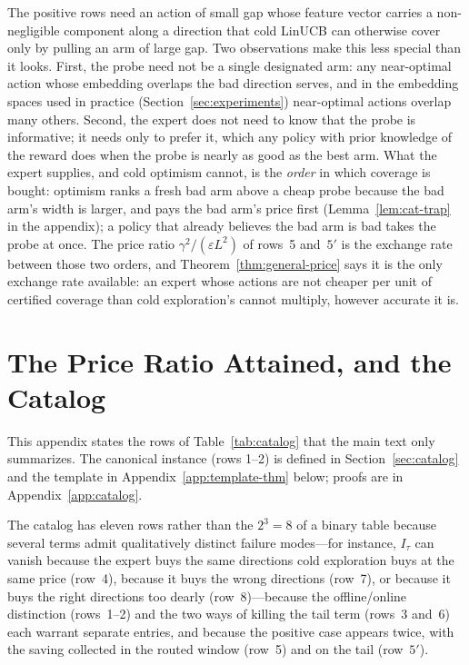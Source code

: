 \documentclass[anon]{alt2027} %
\newcommand{\eps}{\varepsilon}
\begin{document}
The positive rows need an action of small gap whose feature vector carries a
non-negligible component along a direction that cold LinUCB can otherwise
cover only by pulling an arm of large gap. Two observations make this less
special than it looks. First, the probe need not be a single designated arm:
any near-optimal action whose embedding overlaps the bad direction serves,
and in the embedding spaces used in practice (Section~\ref{sec:experiments})
near-optimal actions overlap many others. Second, the expert does not need to
know that the probe is informative; it needs only to prefer it, which any
policy with prior knowledge of the reward does when the probe is nearly as
good as the best arm. What the expert supplies, and cold optimism cannot, is
the \emph{order} in which coverage is bought: optimism ranks a fresh bad arm
above a cheap probe because the bad arm's width is larger, and pays the bad
arm's price first (Lemma~\ref{lem:cat-trap} in the appendix); a policy that
already believes the bad arm is bad takes the probe at once. The price ratio
$\gamma^2/(\eps L^2)$ of rows~5 and~$5'$ is the exchange rate between those two
orders, and Theorem~\ref{thm:general-price} says it is the only exchange rate
available: an expert whose actions are not cheaper per unit of certified
coverage than cold exploration's cannot multiply, however accurate it is.

\section{The Price Ratio Attained, and the Catalog}
\label{app:catalog-statements}

This appendix states the rows of Table~\ref{tab:catalog} that the main text
only summarizes. The canonical instance (rows 1--2) is defined in
Section~\ref{sec:catalog} and the template in Appendix~\ref{app:template-thm}
below; proofs are in Appendix~\ref{app:catalog}.

The catalog has eleven rows rather than the $2^3=8$ of a binary table
because several terms admit qualitatively distinct failure modes---for
instance, $I_\tau$ can vanish because the expert buys the same directions cold
exploration buys at the same price (row~4), because it buys the wrong
directions (row~7), or because it buys the right directions too dearly
(row~8)---because the offline/online distinction (rows~1--2) and the two
ways of killing the tail term (rows~3 and~6) each warrant separate entries,
and because the positive case appears twice, with the saving collected in
the routed window (row~5) and on the tail (row~$5'$).
\end{document}
